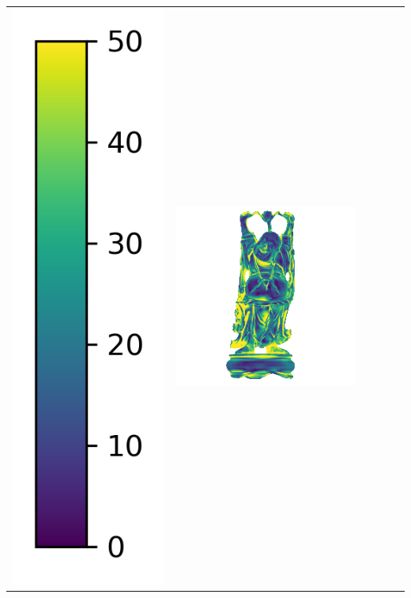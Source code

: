 \begin{center}
\begin{tabularx}{\linewidth}{@{}Y@{}Y@{}Y@{}Y@{}Y@{}Y@{}}
\includegraphics[width=0.2\linewidth]{semisynthetic/colorbar_error_vertical.png} &
\includegraphics[width=\linewidth]{semisynthetic/20160617_20_ours_err.png} &

\end{tabularx}
\end{center}
